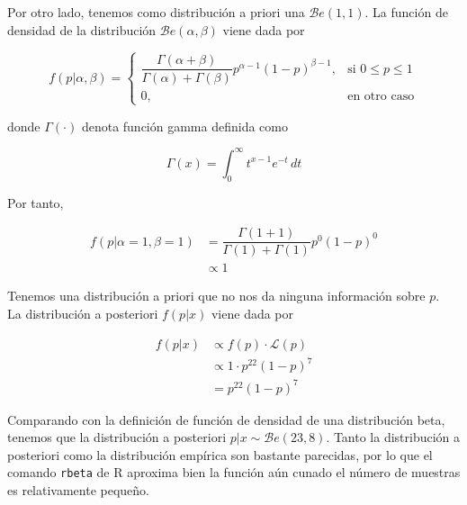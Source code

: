 \documentclass[12pt,a4paper,twoside,openright,titlepage,final]{article}
\begin{document}
Por otro lado, tenemos como distribución a priori una $\mathcal{B}e(1,1)$. La función de densidad de la distribución $\mathcal{B}e(\alpha, \beta)$ viene dada por

\begin{equation*}
f(p|\alpha, \beta) = \begin{cases}
\dfrac{\Gamma(\alpha + \beta)}{\Gamma(\alpha) + \Gamma(\beta)}p^{\alpha - 1}(1-p)^{\beta - 1}, & \text{si } 0 \leq p \leq 1\\
0, & \text{en otro caso} 
\end{cases}
\end{equation*} 

donde $\Gamma(\cdot)$ denota función gamma definida como

\begin{equation*}
\Gamma(x) = \int_{0}^{\infty} t^{x-1}e^{-t} \, dt
\end{equation*}

Por tanto,

\begin{align*}
f(p | \alpha = 1, \beta = 1) & = \dfrac{\Gamma(1 + 1)}{\Gamma(1) + \Gamma(1)}p^{0}(1-p)^{0} \\ & \propto 1 
\end{align*}

Tenemos una distribución a priori que no nos da ninguna información sobre $p$.\\

La distribución a posteriori $f(p|x)$ viene dada por

\begin{align*}
f(p|x) & \propto f(p) \cdot \mathcal{L}(p) \\ & \propto 1 \cdot p^{22}(1-p)^{7} \\ & = p^{22}(1-p)^{7}
\end{align*}

Comparando con la definición de función de densidad de una distribución beta, tenemos que la distribución a posteriori $p|x \sim \mathcal{B}e(23,8)$. Tanto la distribución a posteriori como la distribución empírica son bastante parecidas, por lo que el comando \texttt{rbeta} de R aproxima bien la función aún cunado el número de muestras es relativamente pequeño.\\
\end{document}
